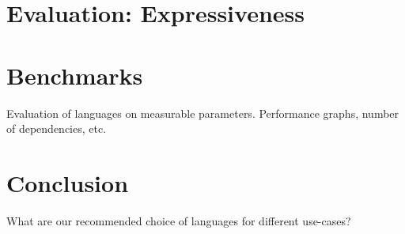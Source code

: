 \chapter{Evaluation: Expressiveness}

\chapter{Benchmarks}
Evaluation of languages on measurable parameters. Performance graphs,
number of dependencies, etc.

\chapter{Conclusion}
What are our recommended choice of languages for different use-cases?

